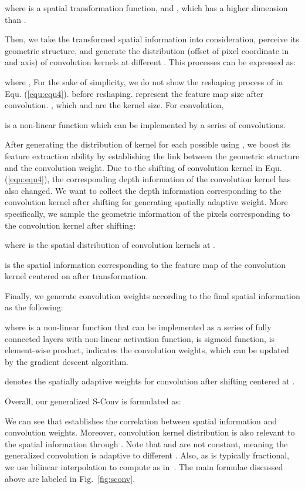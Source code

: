 \documentclass[journal]{IEEEtran}
\newcommand{\figref}[1]{Fig.~\ref{#1}}
\newcommand{\equref}[1]{Equ. (\ref{#1})}
\begin{document}
where  is a spatial transformation function, and
,
which has a higher dimension than .

Then, we take the transformed spatial information  into consideration,
perceive its geometric structure, and generate the distribution 
(offset of pixel coordinate in  and axis)
of convolution kernels at different .
This processes can be expressed as:

where ,
For the sake of simplicity, 
we do not show the reshaping process of  in \equref{equ:equ4}.
 before reshaping.
 represent the feature map size after convolution. 
, which  and  are the kernel size. 
For  convolution, 

 is a non-linear function which can be implemented
by a series of convolutions. 





After generating the distribution of kernel for each possible
 using , 
we boost its feature extraction
ability by establishing the link between the geometric
structure and the convolution weight.
Due to the shifting of convolution kernel in \equref{equ:equ4}, 
the corresponding depth information of the convolution kernel 
has also changed.
We want to collect the depth information corresponding to the convolution kernel after shifting for generating spatially adaptive weight.
More specifically, we sample the geometric information of the
pixels corresponding to the convolution kernel after shifting:

where  is the spatial
distribution of convolution kernels at .

is the spatial information corresponding to the feature map
of the convolution kernel centered on 
after transformation.


Finally, we generate convolution weights according to the 
final spatial information as the following:

where  is a non-linear function that can be implemented
as a series of fully connected layers with non-linear activation function,
 is sigmoid function,  is element-wise product,
 indicates the convolution
weights, which can be updated by the gradient descent algorithm.

denotes the spatially adaptive weights for convolution after shifting
centered at .


Overall, our generalized S-Conv is formulated as:

We can see that  establishes the correlation
between spatial information and convolution weights.
Moreover, convolution kernel distribution is also relevant to the spatial 
information through .
Note that  and
 are not constant, meaning the
generalized convolution is adaptive to different .
Also, as  is typically fractional,
we use bilinear interpolation to compute  as in~\cite{deform, stn}.
The main formulae discussed above are labeled in \figref{fig:sconv}.
\end{document}
